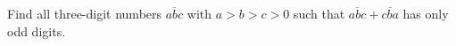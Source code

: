 Find all three-digit numbers $\overline{abc}$ with $a>b>c>0$ such that $\overline{abc}+\overline{cba}$ has only odd digits.
